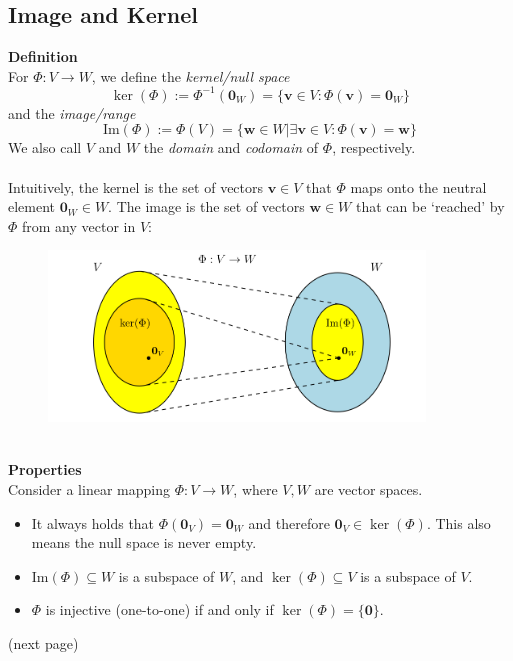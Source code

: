 \documentclass{report}
\begin{document}
\subsection{Image and Kernel} %
\textbf{Definition}\\
For $\Phi:V\to W$, we define the \textit{kernel/null space}
\begin{equation*}
\ker(\Phi):=\Phi^{-1}(\mathbf{0}_W)=\{\bm{v}\in V:\Phi(\bm{v})=\mathbf{0}_W\}
\end{equation*}
and the \textit{image/range}
\begin{equation*}
\text{Im}(\Phi):=\Phi(V)=\{\bm{w}\in W|\exists\bm{v}\in V:\Phi(\bm{v})=\bm{w}\}
\end{equation*}
We also call $V$ and $W$ the \textit{domain} and \textit{codomain} of $\Phi$, respectively.\\
\vspace{1mm}\\
Intuitively, the kernel is the set of vectors $\bm{v}\in V$ that $\Phi$ maps onto the neutral element
$\mathbf{0}_W\in W$. The image is the set of vectors $\bm{w}\in W$ that can be
`reached' by $\Phi$ from any vector in $V$:
\begin{figure}[h]
\includegraphics[width=10cm]{3}\\
\centering
\end{figure}\\
\textbf{Properties}\\
Consider a linear mapping $\Phi:V\to W$, where $V,W$ are vector spaces.
\begin{itemize}
\item It always holds that $\Phi(\mathbf{0}_V)=\mathbf{0}_W$ and therefore 
$\mathbf{0}_V\in\ker(\Phi)$. This also means the null space is never empty.
\item$\text{Im}(\Phi)\subseteq W$ is a subspace of $W$, and $\ker(\Phi)\subseteq V$ is a subspace of $V$.
\item$\Phi$ is injective (one-to-one) if and only if $\ker(\Phi)=\{\mathbf{0}\}$.
\end{itemize}
(next page)
\end{document}
